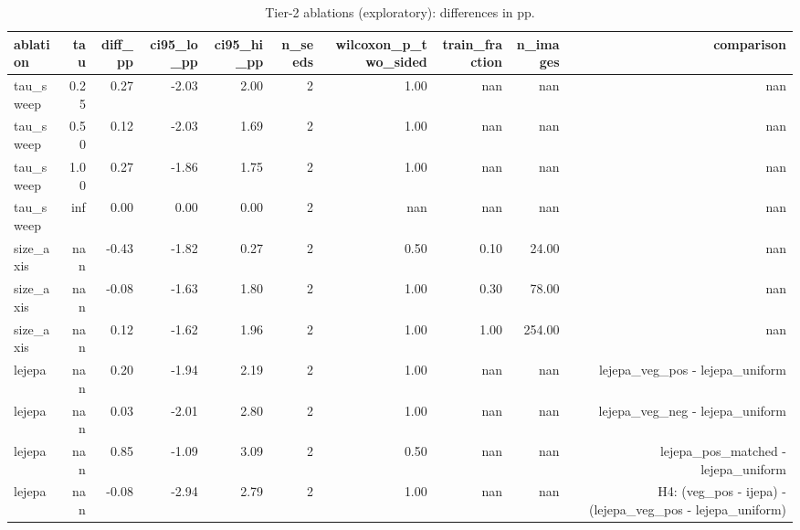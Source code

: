 \begin{table}[t]
\centering
\small
\caption{Tier-2 ablations (exploratory): differences in pp.}
\label{tab:ablations_tier2}
\begin{tabular}{lrrrrrrrrr}
\toprule
ablation & tau & diff\_pp & ci95\_lo\_pp & ci95\_hi\_pp & n\_seeds & wilcoxon\_p\_two\_sided & train\_fraction & n\_images & comparison \\
\midrule
tau\_sweep & 0.25 & 0.27 & -2.03 & 2.00 & 2 & 1.00 & nan & nan & nan \\
tau\_sweep & 0.50 & 0.12 & -2.03 & 1.69 & 2 & 1.00 & nan & nan & nan \\
tau\_sweep & 1.00 & 0.27 & -1.86 & 1.75 & 2 & 1.00 & nan & nan & nan \\
tau\_sweep & inf & 0.00 & 0.00 & 0.00 & 2 & nan & nan & nan & nan \\
size\_axis & nan & -0.43 & -1.82 & 0.27 & 2 & 0.50 & 0.10 & 24.00 & nan \\
size\_axis & nan & -0.08 & -1.63 & 1.80 & 2 & 1.00 & 0.30 & 78.00 & nan \\
size\_axis & nan & 0.12 & -1.62 & 1.96 & 2 & 1.00 & 1.00 & 254.00 & nan \\
lejepa & nan & 0.20 & -1.94 & 2.19 & 2 & 1.00 & nan & nan & lejepa\_veg\_pos - lejepa\_uniform \\
lejepa & nan & 0.03 & -2.01 & 2.80 & 2 & 1.00 & nan & nan & lejepa\_veg\_neg - lejepa\_uniform \\
lejepa & nan & 0.85 & -1.09 & 3.09 & 2 & 0.50 & nan & nan & lejepa\_pos\_matched - lejepa\_uniform \\
lejepa & nan & -0.08 & -2.94 & 2.79 & 2 & 1.00 & nan & nan & H4: (veg\_pos - ijepa) - (lejepa\_veg\_pos - lejepa\_uniform) \\
\bottomrule
\end{tabular}
\end{table}
